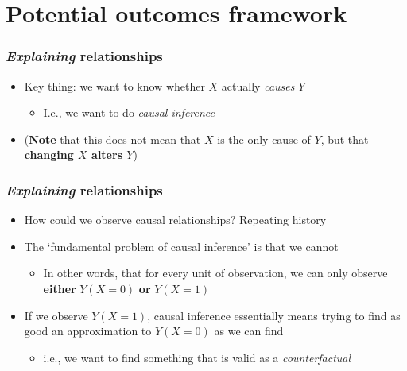 \documentclass[aspectratio=43]{beamer}
\begin{document}
%
%
%

\section{Potential outcomes framework}

\begin{frame}
\frametitle{\textit{Explaining} relationships}
\centering

\begin{itemize}[<+->]
  \item Key thing: we want to know whether $X$ actually \textit{causes} $Y$
  \begin{itemize}
    \item I.e., we want to do \textit{causal inference}
  \end{itemize}
  \item (\textbf{Note} that this does not mean that $X$ is the only cause of $Y$, but that \textbf{changing $X$ alters $Y$})
\end{itemize}

\end{frame}

\begin{frame}
\frametitle{\textit{Explaining} relationships}
\centering

\begin{itemize}[<+->]
  \item How could we observe causal relationships? Repeating history
  \item The `fundamental problem of causal inference' is that we cannot
  \begin{itemize}
    \item In other words, that for every unit of observation, we can only observe \textbf{either} $Y(X=0)$ \textbf{or} $Y(X=1)$
  \end{itemize}
  \item If we observe $Y(X=1)$, causal inference essentially means trying to find as good an approximation to $Y(X=0)$ as we can find
  \begin{itemize}
    \item i.e., we want to find something that is valid as a \textit{counterfactual}
  \end{itemize}
\end{itemize}

\end{frame}
\end{document}
